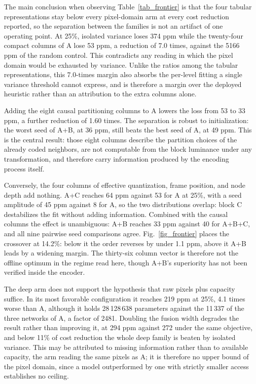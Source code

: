 \documentclass[conference]{IEEEtran}
\begin{document}
The main conclusion when observing Table~\ref{tab_frontier} is that the four
tabular representations stay below every pixel-domain arm at every cost
reduction reported, so the separation between the families is not an artifact of
one operating point. At 25\%, isolated variance loses 374 ppm while the
twenty-four compact columns of A lose 53 ppm, a reduction of 7.0 times, against
the 5166 ppm of the random control. This contradicts any reading in which the
pixel domain would be exhausted by variance. Unlike the ratios among the tabular
representations, this 7.0-times margin also absorbs the per-level fitting a
single variance threshold cannot express, and is therefore a margin over the
deployed heuristic rather than an attribution to the extra columns alone.

Adding the eight causal partitioning columns to A lowers the loss from 53 to 33
ppm, a further reduction of 1.60 times. The separation is robust to
initialization: the worst seed of A+B, at 36 ppm, still beats the best seed of
A, at 49 ppm. This is the central result: those eight columns describe the
partition choices of the already coded neighbors, are not computable from the
block luminance under any transformation, and therefore carry information
produced by the encoding process itself.

Conversely, the four columns of effective quantization, frame position, and node
depth add nothing. A+C reaches 64 ppm against 53 for A at 25\%, with a seed
amplitude of 45 ppm against 8 for A, so the two distributions overlap: block C
destabilizes the fit without adding information. Combined with the causal
columns the effect is unambiguous: A+B reaches 33 ppm against 40 for A+B+C, and
all nine pairwise seed comparisons agree. Fig.~\ref{fig_frontier} places the
crossover at 14.2\%: below it the order reverses by under 1.1 ppm, above it A+B
leads by a widening margin. The thirty-six column vector is therefore not the
offline optimum in the regime read here, though A+B's superiority has not been
verified inside the encoder.

The deep arm does not support the hypothesis that raw pixels plus capacity
suffice. In its most favorable configuration it reaches 219 ppm at 25\%, 4.1
times worse than A, although it holds 28\,128\,638 parameters against the
11\,337 of the three networks of A, a factor of 2481. Doubling the fusion width
degrades the result rather than improving it, at 294 ppm against 272 under the
same objective, and below 11\% of cost reduction the whole deep family is beaten
by isolated variance. This may be attributed to missing information rather than
to available capacity, the arm reading the same pixels as A; it is therefore no
upper bound of the pixel domain, since a model outperformed by one with strictly
smaller access establishes no ceiling.
\end{document}
